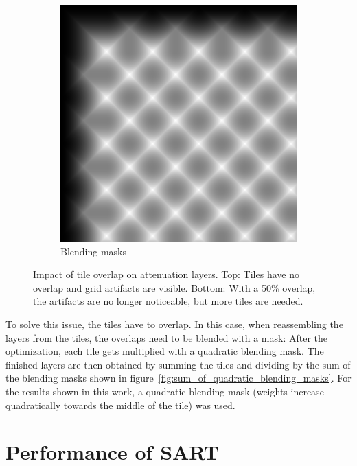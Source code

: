 \begin{figure}[tb]
\begin{subfigure}{0.23\textwidth}
		\vspace{0.15cm}
		
		\includegraphics[width = \textwidth]{../Figures/tiling/tarot_tiles5x5x200x200_overlap0.5_3_layers/blendingMaskSum.png}
		\caption{Blending masks}
	\end{subfigure}%
	\caption[Impact of tile overlap on attenuation layers]
			{Impact of tile overlap on attenuation layers.
			 Top: Tiles have no overlap and grid artifacts are visible.
			 Bottom: With a 50\% overlap, the artifacts are no longer noticeable, but more tiles are needed.}
	\label{fig:comparison_tile_overlap_vs_no_overlap}
\end{figure} 
To solve this issue, the tiles have to overlap. 
In this case, when reassembling the layers from the tiles, the overlaps need to be blended with a mask:
After the optimization, each tile gets multiplied with a quadratic blending mask.
The finished layers are then obtained by summing the tiles and dividing by the sum of the blending masks shown in figure~\ref{fig:sum_of_quadratic_blending_masks}.
For the results shown in this work, a quadratic blending mask (weights increase quadratically towards the middle of the tile) was used.

\section{Performance of SART}
\label{sec:performance_of_SART}

